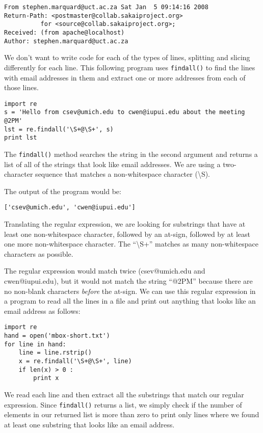 \beforeverb
\begin{verbatim}
From stephen.marquard@uct.ac.za Sat Jan  5 09:14:16 2008
Return-Path: <postmaster@collab.sakaiproject.org>
          for <source@collab.sakaiproject.org>;
Received: (from apache@localhost)
Author: stephen.marquard@uct.ac.za
\end{verbatim}
\afterverb
%
We don't want to write code for each of the types of lines, splitting and slicing differently for each
line.  This following program uses {\tt findall()} to find the lines with email addresses in them and
extract one or more addresses from each of those lines.

\beforeverb
\begin{verbatim}
import re
s = 'Hello from csev@umich.edu to cwen@iupui.edu about the meeting @2PM'
lst = re.findall('\S+@\S+', s)
print lst
\end{verbatim}
\afterverb
%
The {\tt findall()} method searches the string in the second argument and returns a list of
all of the strings that look like email addresses.   We are using a two-character sequence 
that matches a non-whitespace character ({\textbackslash}S). 

The output of the program would be:

\beforeverb
\begin{verbatim}
['csev@umich.edu', 'cwen@iupui.edu']
\end{verbatim}
\afterverb
%
Translating the regular expression, we are looking for substrings that have at least one
non-whitespace character, followed by an at-sign, followed by at least one more non-whitespace
character.  The ``{\textbackslash}S+'' matches as many non-whitespace characters as possible.

The regular expression would match twice (csev@umich.edu and cwen@iupui.edu), but it would not
match the string ``@2PM'' because there are no non-blank characters {\em before} the at-sign.  
We can use this regular expression in a program to read all the lines in a file and print out
anything that looks like an email address as follows:

\beforeverb
\begin{verbatim}
import re
hand = open('mbox-short.txt')
for line in hand:
    line = line.rstrip()
    x = re.findall('\S+@\S+', line)
    if len(x) > 0 :
        print x
\end{verbatim}
\afterverb
%
We read each line and then extract all the substrings that match our regular expression.
Since {\tt findall()} returns a list, we simply check if the number of elements in our returned
list is more than zero to print only lines where we found at least one substring that looks
like an email address.

